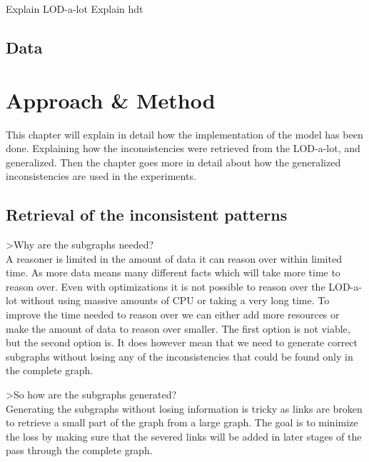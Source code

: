 \documentclass{article}
\begin{document}
Explain LOD-a-lot
Explain hdt

\subsection{Data}


\newpage
\section{Approach \& Method}
This chapter will explain in detail how the implementation of the model has been done. Explaining how the inconsistencies were retrieved from the LOD-a-lot, and generalized. Then the chapter goes more in detail about how the generalized inconsistencies are used in the experiments. 

\subsection{Retrieval of the inconsistent patterns}
>Why are the subgraphs needed?\\

A reasoner is limited in the amount of data it can reason over within limited time. As more data means many different facts which will take more time to reason over. Even with optimizations it is not possible to reason over the LOD-a-lot without using massive amounts of CPU or taking a very long time. To improve the time needed to reason over we can either add more resources or make the amount of data to reason over smaller. The first option is not viable, but the second option is. 
It does however mean that we need to generate correct subgraphs without losing any of the inconsistencies that could be found only in the complete graph.

>So how are the subgraphs generated?\\

Generating the subgraphs without losing information is tricky as links are broken to retrieve a small part of the graph from a large graph. The goal is to minimize the loss by making sure that the severed links will be added in later stages of the pass through the complete graph.
\end{document}
